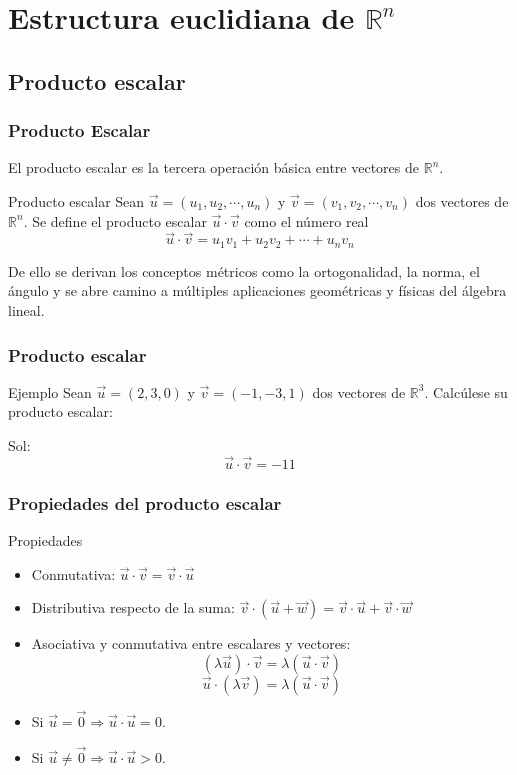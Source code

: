 \documentclass{beamer}
\begin{document}
\section{Estructura euclidiana de $\mathbb{R}^n$}

\subsection{Producto escalar}

\begin{frame}
  \frametitle{Producto Escalar}
El producto escalar es la tercera operaci\'on b\'asica entre vectores de $\mathbb R^n$. 
    \begin{block}{Producto escalar}
    Sean $\vec u = (u_1,u_2,\cdots,u_n)$ y $\vec{v} = (v_1,v_2,\cdots,v_n)$ dos vectores de $\mathbb R^n$. Se define el producto escalar $\vec u \cdot \vec v$ como el n\'umero real
    \[\vec u \cdot \vec v = u_1v_1+u_2v_2+\cdots+u_nv_n\]
\end{block}
De ello se derivan los conceptos m\'etricos como la ortogonalidad, la norma, el \'angulo y se abre camino a m\'ultiples aplicaciones geom\'etricas y f\'isicas del \'algebra lineal. 
\end{frame}


\begin{frame}
  \frametitle{Producto escalar}
    \begin{block}{Ejemplo}
    Sean $\vec u = (2,3,0)$ y $\vec{v} = (-1,-3,1)$ dos vectores de $\mathbb R^3$. Calc\'ulese su producto escalar:
\end{block}
Sol:    \[\vec u \cdot \vec v = -11\]
\end{frame}


\begin{frame}
  \frametitle{Propiedades del producto escalar}
    \begin{block}{Propiedades}
\begin{itemize}
\item Conmutativa: $\vec u\cdot \vec v = \vec v \cdot \vec u $
\item Distributiva respecto de la suma: $\vec v \cdot (\vec u + \vec w) = \vec v\cdot \vec u + \vec v \cdot \vec w$
\item Asociativa y conmutativa entre escalares y vectores: 
\[(\lambda\vec u) \cdot \vec v = \lambda (\vec u \cdot \vec v)\]
\[\vec u\cdot (\lambda \vec v) = \lambda (\vec u \cdot \vec v)\]
\item Si $\vec u = \vec 0 \Rightarrow \vec u \cdot \vec u = 0$. 
\item Si $\vec u \neq \vec 0 \Rightarrow \vec u \cdot \vec u > 0$.
\end{itemize}
\end{block}
\end{frame}
\end{document}
